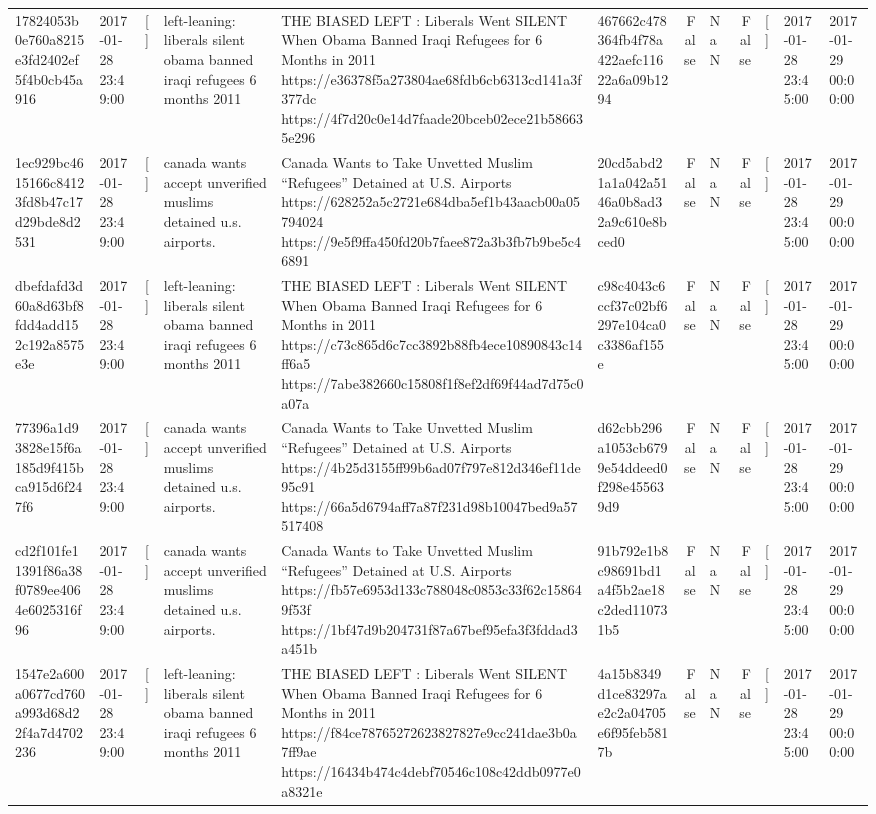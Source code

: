 \begin{tabular}{llllllrlrlll}
17824053b0e760a8215e3fd2402ef5f4b0cb45a916 & 2017-01-28 23:49:00 & [] & left-leaning: liberals silent obama banned iraqi refugees 6 months 2011 & THE BIASED LEFT : Liberals Went SILENT When Obama Banned Iraqi Refugees for 6 Months in 2011 https://e36378f5a273804ae68fdb6cb6313cd141a3f377dc https://4f7d20c0e14d7faade20bceb02ece21b586635e296 & 467662c478364fb4f78a422aefc11622a6a09b1294 & False & NaN & False & [] & 2017-01-28 23:45:00 & 2017-01-29 00:00:00 \\
1ec929bc4615166c84123fd8b47c17d29bde8d2531 & 2017-01-28 23:49:00 & [] & canada wants accept unverified muslims detained u.s. airports. & Canada Wants to Take Unvetted Muslim “Refugees” Detained at U.S. Airports https://628252a5c2721e684dba5ef1b43aacb00a05794024 https://9e5f9ffa450fd20b7faee872a3b3fb7b9be5c46891 & 20cd5abd21a1a042a5146a0b8ad32a9c610e8bced0 & False & NaN & False & [] & 2017-01-28 23:45:00 & 2017-01-29 00:00:00 \\
dbefdafd3d60a8d63bf8fdd4add152c192a8575e3e & 2017-01-28 23:49:00 & [] & left-leaning: liberals silent obama banned iraqi refugees 6 months 2011 & THE BIASED LEFT : Liberals Went SILENT When Obama Banned Iraqi Refugees for 6 Months in 2011 https://c73c865d6c7cc3892b88fb4ece10890843c14ff6a5 https://7abe382660c15808f1f8ef2df69f44ad7d75c0a07a & c98c4043c6ccf37c02bf6297e104ca0c3386af155e & False & NaN & False & [] & 2017-01-28 23:45:00 & 2017-01-29 00:00:00 \\
77396a1d93828e15f6a185d9f415bca915d6f247f6 & 2017-01-28 23:49:00 & [] & canada wants accept unverified muslims detained u.s. airports. & Canada Wants to Take Unvetted Muslim “Refugees” Detained at U.S. Airports https://4b25d3155ff99b6ad07f797e812d346ef11de95c91 https://66a5d6794aff7a87f231d98b10047bed9a57517408 & d62cbb296a1053cb6799e54ddeed0f298e455639d9 & False & NaN & False & [] & 2017-01-28 23:45:00 & 2017-01-29 00:00:00 \\
cd2f101fe11391f86a38f0789ee4064e6025316f96 & 2017-01-28 23:49:00 & [] & canada wants accept unverified muslims detained u.s. airports. & Canada Wants to Take Unvetted Muslim “Refugees” Detained at U.S. Airports https://fb57e6953d133c788048c0853c33f62c158649f53f https://1bf47d9b204731f87a67bef95efa3f3fddad3a451b & 91b792e1b8c98691bd1a4f5b2ae18c2ded110731b5 & False & NaN & False & [] & 2017-01-28 23:45:00 & 2017-01-29 00:00:00 \\
1547e2a600a0677cd760a993d68d22f4a7d4702236 & 2017-01-28 23:49:00 & [] & left-leaning: liberals silent obama banned iraqi refugees 6 months 2011 & THE BIASED LEFT : Liberals Went SILENT When Obama Banned Iraqi Refugees for 6 Months in 2011 https://f84ce78765272623827827e9cc241dae3b0a7ff9ae https://16434b474c4debf70546c108c42ddb0977e0a8321e & 4a15b8349d1ce83297ae2c2a04705e6f95feb5817b & False & NaN & False & [] & 2017-01-28 23:45:00 & 2017-01-29 00:00:00 \\

\end{tabular}
